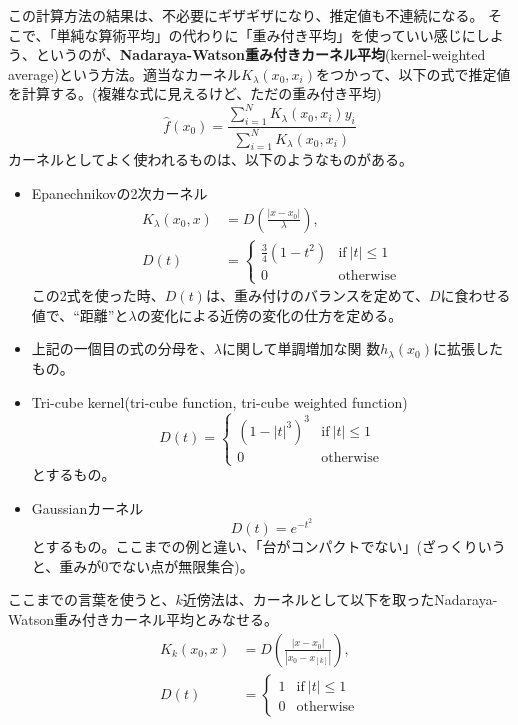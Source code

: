 \documentclass[uplatex]{jsarticle}
\begin{document}
この計算方法の結果は、不必要にギザギザになり、推定値も不連続になる。
そこで、「単純な算術平均」の代わりに「重み付き平均」を使っていい感じにしよう、というのが、\textbf{Nadaraya-Watson重み付きカーネル平均}(kernel-weighted average)という方法。適当なカーネル$K_{\lambda}(x_{0}, x_{i})$をつかって、以下の式で推定値を計算する。(複雑な式に見えるけど、ただの重み付き平均)
\[
  \hat{f} (x_{0})=\frac{\sum_{i=1}^{N}K_{\lambda}(x_{0}, x_{i})y_{i}}{\sum_{i=1}^{N}K_{\lambda}(x_{0}, x_{i})}
\]
カーネルとしてよく使われるものは、以下のようなものがある。
\begin{itemize}
  \item Epanechnikovの2次カーネル
    \begin{align*}
      K_{\lambda}(x_{0}, x) &=D \left (\frac{|x-x_{0}|}{\lambda} \right ),  \\
      D(t) &=
      \begin{cases}
          \frac{3}{4}(1-t^{2}) & \mathrm{if} \  |t| \le 1 \\
          0 & \mathrm{otherwise}
      \end{cases}
    \end{align*}
    この2式を使った時、$D(t)$は、重み付けのバランスを定めて、$D$に食わせる値で、``距離''と$\lambda$の変化による近傍の変化の仕方を定める。
  \item 上記の一個目の式の分母を、$\lambda$に関して単調増加な関 数$h_{\lambda}(x_{0})$に拡張したもの。
  \item Tri-cube kernel(tri-cube function, tri-cube weighted function)
    \[
      D(t) =
      \begin{cases}
          (1-|t|^{3})^{3} & \mathrm{if} \  |t| \le 1 \\
          0 & \mathrm{otherwise}
      \end{cases}
    \]
    とするもの。
  \item Gaussianカーネル
    \[
      D(t) = e^{-t^{2}}
    \]
    とするもの。ここまでの例と違い、「台がコンパクトでない」(ざっくりいうと、重みが0でない点が無限集合)。
\end{itemize}

ここまでの言葉を使うと、$k$近傍法は、カーネルとして以下を取ったNadaraya-Watson重み付きカーネル平均とみなせる。
\begin{align*}
  K_{k}(x_{0}, x) &=D \left (\frac{|x-x_{0}|}{|x_{0}-x_{[k]}|} \right ),  \\
  D(t) &=
  \begin{cases}
    1 & \mathrm{if} \  |t| \le 1 \\
    0 & \mathrm{otherwise}
  \end{cases}
\end{align*}
\end{document}
